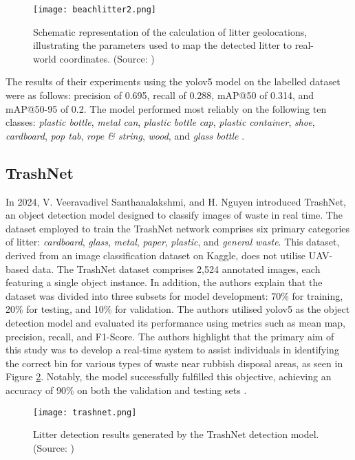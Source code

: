 \begin{figure}[!htbp]
    \centering
    \texttt{[image: beachlitter2.png]}
    \caption{Schematic representation of the calculation of litter geolocations, illustrating the parameters used to map the detected litter to real-world coordinates. (Source: \cite{beach_litter})}
    \label{fig:beachlitter2}
\end{figure}

The results of their experiments using the \gls{yolo}v5 model on the labelled dataset were as follows: precision of 0.695, recall of 0.288, mAP@50 of 0.314, and mAP@50-95 of 0.2. The model performed most reliably on the following ten classes: \textit{plastic bottle}, \textit{metal can}, \textit{plastic bottle} \textit{cap}, \textit{plastic container}, \textit{shoe}, \textit{cardboard}, \textit{pop tab}, \textit{rope \& string}, \textit{wood}, and \textit{glass bottle} \cite{beach_litter}.

\subsection{TrashNet}
\label{subsec:3_trashnet}

In 2024, V. Veeravadivel Santhanalakshmi, and H. Nguyen introduced TrashNet, an object detection model designed to classify images of waste in real time. The dataset employed to train the TrashNet network comprises six primary categories of litter: \textit{cardboard}, \textit{glass}, \textit{metal}, \textit{paper}, \textit{plastic}, and \textit{general waste}. This dataset, derived from an image classification dataset on Kaggle, does not utilise UAV-based data. The TrashNet dataset comprises 2,524 annotated images, each featuring a single object instance. In addition, the authors explain that the dataset was divided into three subsets for model development: 70\% for training, 20\% for testing, and 10\% for validation.
The authors utilised \gls{yolo}v5 as the object detection model and evaluated its performance using metrics such as mean \gls{map}, precision, recall, and F1-Score. 
The authors highlight that the primary aim of this study was to develop a real-time system to assist individuals in identifying the correct bin for various types of waste near rubbish disposal areas, as seen in Figure \ref{fig:trashnet}. Notably, the model successfully fulfilled this objective, achieving an accuracy of 90\% on both the validation and testing sets \cite{trashnet}.

\begin{figure}[!htbp]
    \centering
    \texttt{[image: trashnet.png]}
    \caption{Litter detection results generated by the TrashNet detection model. (Source: \cite{trashnet})}
    \label{fig:trashnet}
\end{figure}

